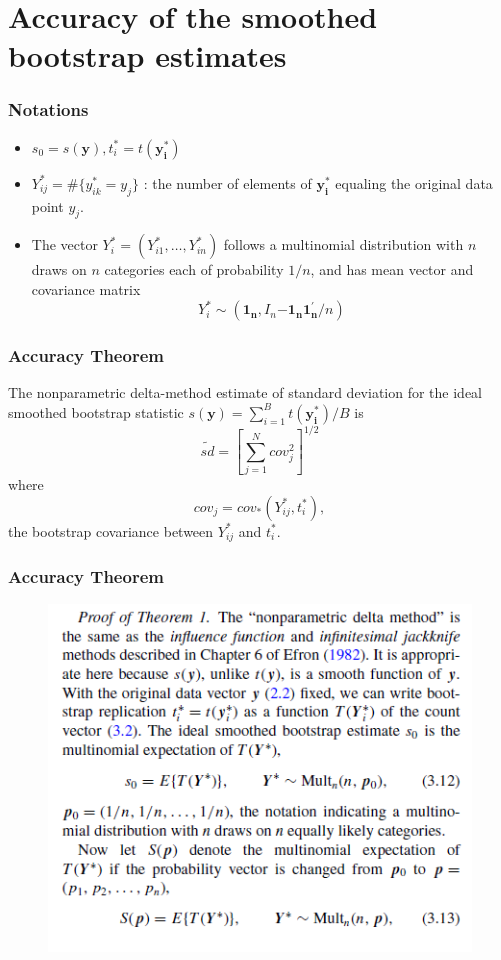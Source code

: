 \documentclass{beamer}
\begin{document}
\section{Accuracy of the smoothed bootstrap estimates}
\begin{frame}
\frametitle{Notations}
\begin{itemize}
\item $s_0 = s(\mathbf{y}), t_i ^* = t( \mathbf{y_i ^*})$
\item $Y_{ij} ^* = \#\{y_{ik} ^* = y_{j} \}$ : the number of elements of $\mathbf{y_i ^*}$ equaling the original data point $y_j$.
\item The vector $Y_i ^* = (Y_{i1} ^*, \dots, Y_{in} ^*)$ follows a multinomial distribution with $n$ draws on $n$ categories each of probability $1/n$, and has mean vector and covariance matrix 
$$Y_i ^* \sim (\mathbf{1_n}, I_n \mathbf{- 1_n 1_n ^{'}} /n) $$
\end{itemize}
\end{frame}
\begin{frame}
\frametitle{Accuracy Theorem}
\begin{theorem}
The nonparametric delta-method estimate of standard deviation for the ideal smoothed bootstrap statistic $s(\mathbf{y}) = \sum_{i=1} ^B t(\mathbf{y_i ^*}) /B$ is
$$ \tilde{sd} = \left[ \sum_{j=1} ^N cov_j ^2\right] ^{1/2}$$
where
$$ cov_j = cov_* (Y_{ij} ^* , t_i ^*),$$
the bootstrap covariance between $Y_{ij} ^*$ and $t_i ^*$.
\end{theorem}
\end{frame}
\begin{frame}
\frametitle{Accuracy Theorem}
\begin{figure}[h]
\centering
\includegraphics[width=220bp, height= 180bp]{proof1_e.png}
\end{figure}
\end{frame}
\end{document}
